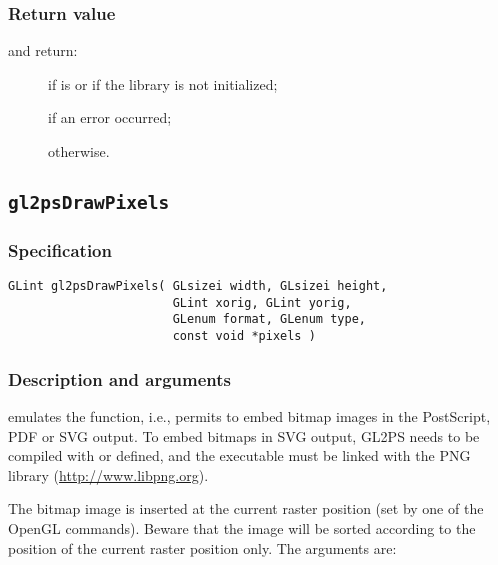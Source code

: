 \subsubsection{Return value}

\noindent{} and  return:
\begin{description}
\item[] if  is  or if the
library is not initialized;
\item[] if an error occurred;
\item[] otherwise.
\end{description}


\subsection{\texttt{gl2psDrawPixels}}
\label{sec:gl2psDrawPixels}

\subsubsection{Specification}

\begin{verbatim}
GLint gl2psDrawPixels( GLsizei width, GLsizei height,
                       GLint xorig, GLint yorig,
                       GLenum format, GLenum type,
                       const void *pixels )
\end{verbatim}

\subsubsection{Description and arguments}

 emulates the  function, i.e.,
permits to embed bitmap images in the PostScript, PDF or SVG output.
To embed bitmaps in SVG output, GL2PS needs to be compiled with
 or  defined, and the executable
must be linked with the PNG library (\url{http://www.libpng.org}).

The bitmap image is inserted at the current raster position (set by
one of the  OpenGL commands). Beware that the image
will be sorted according to the position of the current raster
position only. The arguments are:

